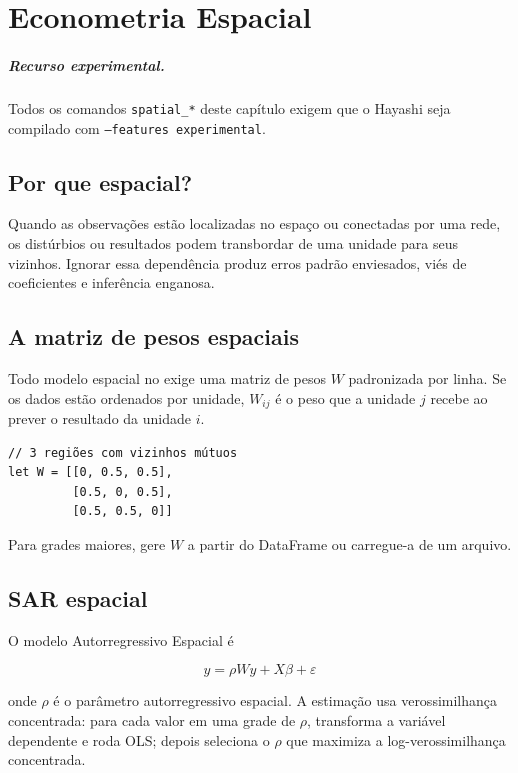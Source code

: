 \chapter{Econometria Espacial}

\paragraph*{Recurso experimental.} Todos os comandos \texttt{spatial\_*} deste
capítulo exigem que o Hayashi seja compilado com \texttt{--features experimental}.

\section{Por que espacial?}

Quando as observações estão localizadas no espaço ou conectadas por uma
rede, os distúrbios ou resultados podem transbordar de uma unidade para
seus vizinhos. Ignorar essa dependência produz erros padrão enviesados,
viés de coeficientes e inferência enganosa.

\section{A matriz de pesos espaciais}

Todo modelo espacial no \hayashi{} exige uma matriz de pesos $W$
padronizada por linha. Se os dados estão ordenados por unidade,
$W_{ij}$ é o peso que a unidade $j$ recebe ao prever o resultado da
unidade $i$.

\begin{lstlisting}[caption={Matriz de pesos espaciais}]
// 3 regiões com vizinhos mútuos
let W = [[0, 0.5, 0.5],
         [0.5, 0, 0.5],
         [0.5, 0.5, 0]]
\end{lstlisting}

Para grades maiores, gere $W$ a partir do DataFrame ou carregue-a de um
arquivo.

\section{SAR espacial}

O modelo Autorregressivo Espacial é

\[
y = \rho W y + X\beta + \varepsilon
\]

onde $\rho$ é o parâmetro autorregressivo espacial. A estimação usa
verossimilhança concentrada: para cada valor em uma grade de $\rho$,
transforma a variável dependente e roda OLS; depois seleciona o $\rho$
que maximiza a log-verossimilhança concentrada.

